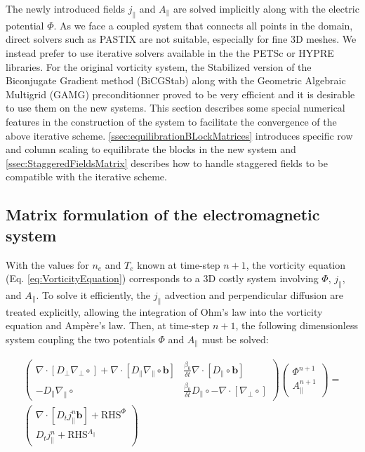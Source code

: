 The newly introduced fields $j_\parallel$ and $A_\parallel$ are solved implicitly along with the electric potential $\Phi$. As we face a coupled system that connects all points in the domain, direct solvers such as PASTIX are not suitable, especially for fine 3D meshes. We instead prefer to use iterative solvers available in the the PETSc or HYPRE libraries. For the original vorticity system, the Stabilized version of the Biconjugate Gradient method (BiCGStab) along with the Geometric Algebraic Multigrid (GAMG) preconditionner proved to be very efficient and it is desirable to use them on the new systems. This section describes some special numerical features in the construction of the system to facilitate the convergence of the above iterative scheme. \autoref{ssec:equilibrationBLockMatrices} introduces specific row and column scaling to equilibrate the blocks in the new system and \autoref{ssec:StaggeredFieldsMatrix} describes how to handle staggered fields to be compatible with the iterative scheme.

\subsection{Matrix formulation of the electromagnetic system}

With the values for $n_e$ and $T_e$ known at time-step $n+1$, the vorticity equation (Eq. \ref{eq:VorticityEquation}) corresponds to a 3D costly system involving $\Phi$, $j_\parallel$, and $A_\parallel$. To solve it efficiently, the $j_\parallel$ advection and perpendicular diffusion are treated explicitly, allowing the integration of Ohm's law into the vorticity equation and Ampère's law. Then, at time-step $n+1$, the following dimensionless system coupling the two potentials $\Phi$ and $A_\parallel$ must be solved: \newline

\begin{align}
		\label{eq:impl_implicitVorticitySystem}
	\begin{pmatrix}
		\nabla \cdot \left[ D_\perp \nabla_\perp \circ \right] + \nabla \cdot \left[ D_\parallel \nabla_\parallel \circ \mathbf{b} \right]  
		& \frac{\beta_0}{\delta t} \nabla \cdot \left[ D_\parallel \circ \mathbf{b} \right] \\
		-D_\parallel \nabla_\parallel \circ &
		\frac{\beta_0}{\delta t} D_\parallel \circ - \nabla \cdot \left[ \nabla_\perp \circ \right]
	\end{pmatrix}
	\begin{pmatrix}
		\Phi^{n+1} \\ A_\parallel^{n+1}
	\end{pmatrix} 
	= \nonumber \\
	\begin{pmatrix}
		\nabla \cdot \left[ D_t j^{n}_\parallel \mathbf{b} \right] + \text{RHS}^\Phi \\
		D_t j^{n}_\parallel + \text{RHS}^{A_\parallel}
	\end{pmatrix}
\end{align}

